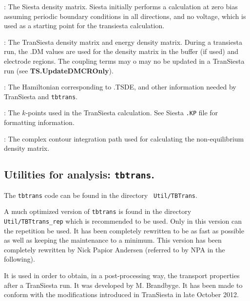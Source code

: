 \documentclass[11pt]{article}
\makeatletter
\newcommand\file[1]{%
    \texttt{#1}\index{#1@\textbf{#1}}%
}
\newcommand\systemfile[1]{%
    \texttt{<SystemLabel>#1}\index{#1@\textbf{#1}}%
}
\makeatother
\begin{document}
\begin{description}
    \itemsep 10pt
    \parsep 0pt
    
    \item[\systemfile{.DM}]: The {\sc Siesta} density matrix. {\sc Siesta} initially
    performs a calculation at zero bias assuming periodic boundary conditions in all
    directions, and no voltage, which is used as a starting point for the transiesta
    calculation.
    
    \item[\systemfile{.TSDE}]: The {\sc TranSiesta} density matrix and energy density
    matrix. During a transiesta run, the .DM values are used for the density matrix in
    the buffer (if used) and electrode regions. The coupling terms may o may no be
    updated in a {\sc TranSiesta} run (see {\bf TS.UpdateDMCROnly}).
    
    \item[\systemfile{.TSHS}]: The Hamiltonian corresponding to .TSDE, and other
    information needed by {\sc TranSiesta} and {\tt tbtrans}.

    \item[\systemfile{.TSKP}]: The $k$-points used in the {\sc TranSiesta} calculation. See
    {\sc Siesta} \file{.KP} file for formatting information.

    \item[\systemfile{.TSCC}]: The complex contour integration path used for calculating
    the non-equilibrium density matrix.

\end{description} 

\subsection{Utilities for analysis: {\tt tbtrans}.}

The {\tt tbtrans} code can be found in the directory {\tt
  Util/TBTrans}. 

A much optimized version of \texttt{tbtrans} is found in the directory
\texttt{Util/TBTtrans\_rep} which is recommended to be used. Only in this version can the
repetition be used. It has been completely rewritten to be as fast as possible as well as
keeping the maintenance to a minimum. This version has been completely rewritten by Nick
Papior Andersen (referred to by NPA in the following).

It is used in order to obtain, in a post-processing
way, the transport properties after a {\sc TranSiesta} run. It was
developed by M. Brandbyge. It has been made to conform
with the modifications introduced in {\sc TranSiesta} in late October 2012. 
\end{document}

